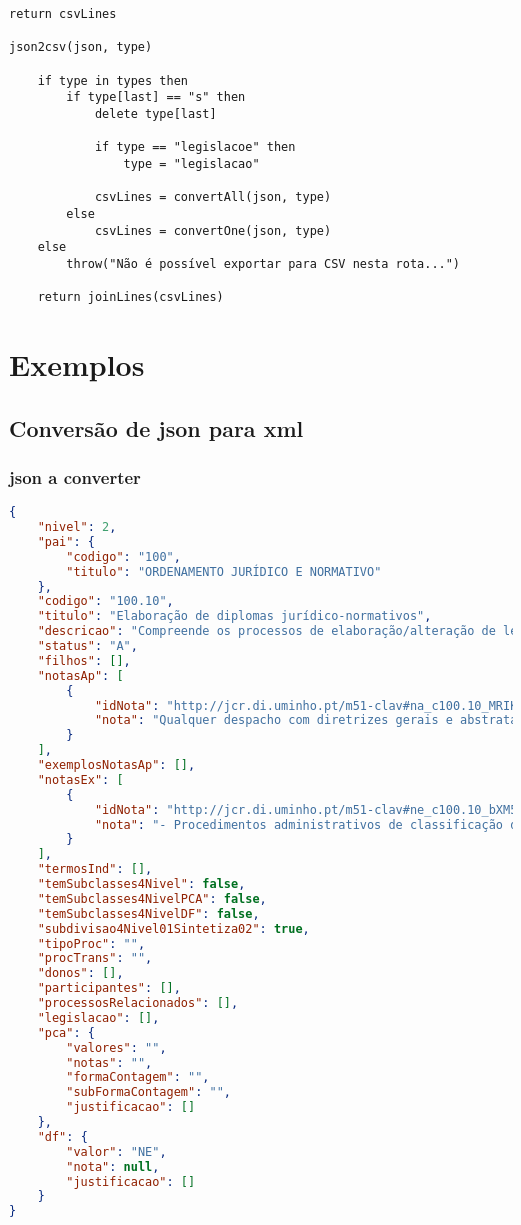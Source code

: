 \begin{lstlisting}[language=pseudocode, caption=Algorítmo de conversão de \acrshort{json} para \acrshort{csv}]
    return csvLines

json2csv(json, type)

    if type in types then
        if type[last] == "s" then
            delete type[last]

            if type == "legislacoe" then
                type = "legislacao"

            csvLines = convertAll(json, type)
        else
            csvLines = convertOne(json, type)
    else
        throw("Não é possível exportar para CSV nesta rota...")

    return joinLines(csvLines)
\end{lstlisting}

\chapter{Exemplos}

\section{Conversão de \acrshort{json} para \acrshort{xml}}\label{conv:jsonTOxml}

\subsection{\acrshort{json} a converter}\label{exem:json}
\begin{lstlisting}[language=json, caption=\acrshort{json} exemplo a converter]
{
    "nivel": 2,
    "pai": {
        "codigo": "100",
        "titulo": "ORDENAMENTO JURÍDICO E NORMATIVO"
    },
    "codigo": "100.10",
    "titulo": "Elaboração de diplomas jurídico-normativos",
    "descricao": "Compreende os processos de elaboração/alteração de legislação, de regulamentos e de diretivas políticas ou operacionais portuguesas.",
    "status": "A",
    "filhos": [],
    "notasAp": [
        {
            "idNota": "http://jcr.di.uminho.pt/m51-clav#na_c100.10_MRIKl-RBu_2sz5u9FzPqH",
            "nota": "Qualquer despacho com diretrizes gerais e abstratas"
        }
    ],
    "exemplosNotasAp": [],
    "notasEx": [
        {
            "idNota": "http://jcr.di.uminho.pt/m51-clav#ne_c100.10_bXM5qoj-hKZt6cijQktaj",
            "nota": "- Procedimentos administrativos de classificação do património cultural devem ser considerados em \"Reconhecimentos e permissões/ Classificação e declaração de interesse ou utilidade pública\" (450.20)"
        }
    ],
    "termosInd": [],
    "temSubclasses4Nivel": false,
    "temSubclasses4NivelPCA": false,
    "temSubclasses4NivelDF": false,
    "subdivisao4Nivel01Sintetiza02": true,
    "tipoProc": "",
    "procTrans": "",
    "donos": [],
    "participantes": [],
    "processosRelacionados": [],
    "legislacao": [],
    "pca": {
        "valores": "",
        "notas": "",
        "formaContagem": "",
        "subFormaContagem": "",
        "justificacao": []
    },
    "df": {
        "valor": "NE",
        "nota": null,
        "justificacao": []
    }
}
\end{lstlisting}

